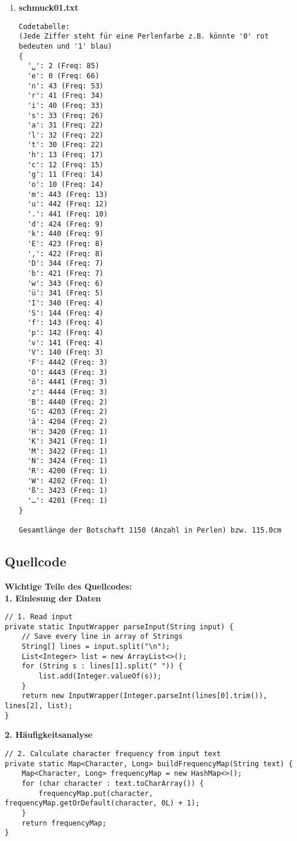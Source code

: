 \documentclass[a4paper,10pt,ngerman]{scrartcl}
\begin{document}
\begin{enumerate}
\item \textbf{schmuck01.txt}
\begin{verbatim}
Codetabelle:
(Jede Ziffer steht für eine Perlenfarbe z.B. könnte '0' rot bedeuten und '1' blau)
{
  '␣': 2 (Freq: 85)
  'e': 0 (Freq: 66)
  'n': 43 (Freq: 53)
  'r': 41 (Freq: 34)
  'i': 40 (Freq: 33)
  's': 33 (Freq: 26)
  'a': 31 (Freq: 22)
  'l': 32 (Freq: 22)
  't': 30 (Freq: 22)
  'h': 13 (Freq: 17)
  'c': 12 (Freq: 15)
  'g': 11 (Freq: 14)
  'o': 10 (Freq: 14)
  'm': 443 (Freq: 13)
  'u': 442 (Freq: 12)
  '.': 441 (Freq: 10)
  'd': 424 (Freq: 9)
  'k': 440 (Freq: 9)
  'E': 423 (Freq: 8)
  ',': 422 (Freq: 8)
  'D': 344 (Freq: 7)
  'b': 421 (Freq: 7)
  'w': 343 (Freq: 6)
  'ü': 341 (Freq: 5)
  'I': 340 (Freq: 4)
  'S': 144 (Freq: 4)
  'f': 143 (Freq: 4)
  'p': 142 (Freq: 4)
  'v': 141 (Freq: 4)
  'V': 140 (Freq: 3)
  'F': 4442 (Freq: 3)
  'O': 4443 (Freq: 3)
  'ö': 4441 (Freq: 3)
  'z': 4444 (Freq: 3)
  'B': 4440 (Freq: 2)
  'G': 4203 (Freq: 2)
  'ä': 4204 (Freq: 2)
  'H': 3420 (Freq: 1)
  'K': 3421 (Freq: 1)
  'M': 3422 (Freq: 1)
  'N': 3424 (Freq: 1)
  'R': 4200 (Freq: 1)
  'W': 4202 (Freq: 1)
  'ß': 3423 (Freq: 1)
  '…': 4201 (Freq: 1)
}

Gesamtlänge der Botschaft 1150 (Anzahl in Perlen) bzw. 115.0cm
\end{verbatim}
\end{enumerate}

\subsection{Quellcode}
\textbf{Wichtige Teile des Quellcodes:}\\
\newline
\vspace{0.5em}
\textbf{1. Einlesung der Daten}
\begin{lstlisting}
// 1. Read input
private static InputWrapper parseInput(String input) {
    // Save every line in array of Strings
    String[] lines = input.split("\n");
    List<Integer> list = new ArrayList<>();
    for (String s : lines[1].split(" ")) {
        list.add(Integer.valueOf(s));
    }
    return new InputWrapper(Integer.parseInt(lines[0].trim()), lines[2], list);
}
\end{lstlisting}

\textbf{2. Häufigkeitsanalyse}
\begin{lstlisting}
// 2. Calculate character frequency from input text
private static Map<Character, Long> buildFrequencyMap(String text) {
    Map<Character, Long> frequencyMap = new HashMap<>();
    for (char character : text.toCharArray()) {
        frequencyMap.put(character, frequencyMap.getOrDefault(character, 0L) + 1);
    }
    return frequencyMap;
}
\end{lstlisting}
\end{document}
